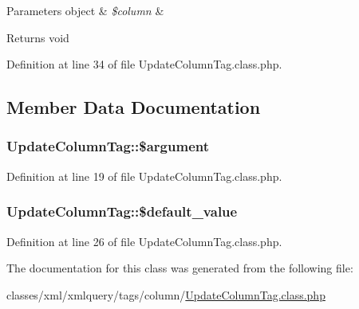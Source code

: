 \begin{DoxyParams}[1]{Parameters}
object & {\em \$column} & \\
\hline
\end{DoxyParams}
\begin{DoxyReturn}{Returns}
void 
\end{DoxyReturn}


Definition at line 34 of file Update\+Column\+Tag.\+class.\+php.



\subsection{Member Data Documentation}
\hypertarget{classUpdateColumnTag_a3312163ccabc7246e2f397390648b75b}{
\subsubsection[{\$argument}]{\setlength{\rightskip}{0pt plus 5cm}Update\+Column\+Tag\+::\$argument}}\label{classUpdateColumnTag_a3312163ccabc7246e2f397390648b75b}


Definition at line 19 of file Update\+Column\+Tag.\+class.\+php.

\hypertarget{classUpdateColumnTag_a63420aa5c0b8c374a4f29d054abbda76}{
\subsubsection[{\$default\+\_\+value}]{\setlength{\rightskip}{0pt plus 5cm}Update\+Column\+Tag\+::\$default\+\_\+value}}\label{classUpdateColumnTag_a63420aa5c0b8c374a4f29d054abbda76}


Definition at line 26 of file Update\+Column\+Tag.\+class.\+php.



The documentation for this class was generated from the following file\+:\begin{DoxyCompactItemize}
\item 
classes/xml/xmlquery/tags/column/\hyperlink{UpdateColumnTag_8class_8php}{Update\+Column\+Tag.\+class.\+php}\end{DoxyCompactItemize}
